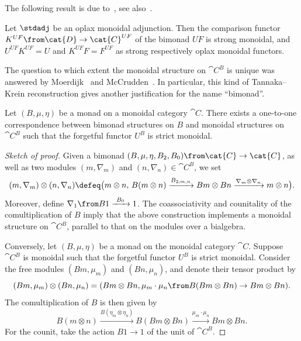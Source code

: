 The following result is due to~\cite{kelly74:doctr},
see also~\cite[Theorem~2.6]{Bruguieres2007}.

\begin{lemma}\label{lem: comparison_functor_bimonad_monoidal}
  Let \(\stdadj\) be an oplax monoidal adjunction.
  Then the comparison functor \(K^{UF}\from \cat{D} \to \cat{C}^{UF}\)
  of the bimonad \(UF\) is strong monoidal,
  and \(U^{UF} K^{UF} = U\) and \(K^{UF} F = F^{UF}\)
  as strong respectively oplax monoidal functors.
\end{lemma}

The question to which extent the monoidal structure on \(\cat{C}^B\) is unique
was answered
by Moerdijk~\cite[Theorem~7.1]{Moerdijk2002}
and McCrudden~\cite[Corollary~3.13]{McCrudden2002}.
In particular,
this kind of Tannaka--Krein reconstruction
gives another justification for the name ``bimonad''.

\begin{proposition}\label{prop: Moerdijk_reconstruction}
  Let \((B, \mu, \eta)\) be a monad on a monoidal category \(\cat{C}\).
  There exists a one-to-one correspondence between
  bimonad structures on \(B\) and
  monoidal structures on \(\cat{C}^B\)
  such that the forgetful functor \(U^B\) is strict monoidal.
\end{proposition}
\begin{proof}[Sketch of proof]
  Given a bimonad \((B, \mu ,\eta, B_2, B_0)\from \cat{C} \to \cat{C}\),
  as well as two modules \((m, \nabla_{m})\) and \((n, \nabla_{n}) \in \cat{C}^B\),
  we set
  \[
    (m, \nabla_{m}) \otimes (n, \nabla_n)
    \defeq
    \big(m \otimes n,\,
    B(m \otimes n) \xrightarrow{B_{2; m, n}} Bm \otimes Bn \xrightarrow{\nabla_m\otimes \nabla_n} m \otimes n
    \big).
  \]
  Moreover, define \(\nabla_{1}\from B1 \xrightarrow{\ B_0\ } 1\).
  The coassociativity and counitality of the comultiplication of \(B\)
  imply that the above construction implements a monoidal structure on \(\cat{C}^B\),
  parallel to that on the modules over a bialgebra.

  Conversely, let \((B, \mu, \eta)\) be a monad
  on the monoidal category \(\cat{C}\).
  Suppose \(\cat{C}^{B}\) is monoidal
  such that the forgetful functor \(U^B\) is strict monoidal.
  Consider the free modules \((Bm, \mu_m)\) and \((Bn, \mu_n)\),
  and denote their tensor product by
  \[
    (Bm, \mu_m) \otimes (Bn, \mu_n) = (Bm \otimes Bn, \mu_m \cdot \mu_n\from B(Bm \otimes Bn) \to Bm \otimes Bn).
  \]
  The comultiplication of \(B\) is then given by
  \[
    B(m \otimes n) \xrightarrow{B(\eta_m \otimes \eta_n)} B(Bm \otimes Bn) \xrightarrow{\mu_m \cdot \mu_n} Bm \otimes Bn.
  \]
  For the counit, take the action \(B1 \to 1\) of the unit of \(\cat{C}^{B}\).
\end{proof}

